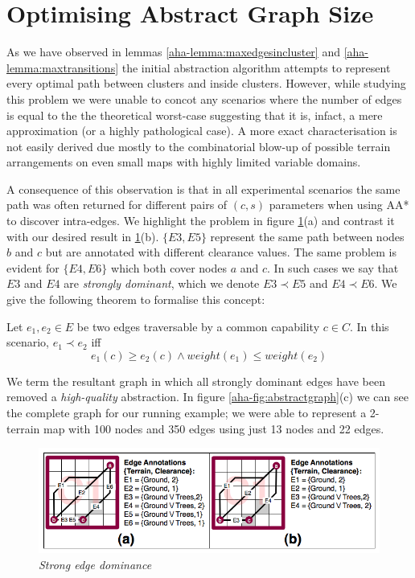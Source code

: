 \section{Optimising Abstract Graph Size}
\par \indent
As we have observed in lemmas \ref{aha-lemma:maxedgesincluster} and \ref{aha-lemma:maxtransitions} the initial abstraction algorithm attempts to represent every optimal path between clusters and inside clusters. However, while studying this problem we were unable to concot any scenarios where the number of edges is equal to the the theoretical worst-case suggesting that it is, infact, a mere approximation (or a highly pathological case).  A more exact characterisation is not easily derived due mostly to the combinatorial blow-up of possible terrain arrangements on even small maps with highly limited variable domains.
\par \indent 
A consequence of this observation is that in all experimental scenarios the same path was often returned for different pairs of $(c, s)$ parameters when using AA* to discover intra-edges. We highlight the problem in figure \ref{aha-fig:strongdominance}(a) and contrast it with our desired result in \ref{aha-fig:strongdominance}(b). $\lbrace E3, E5 \rbrace$ represent the same path between nodes $b$ and $c$ but are annotated with different clearance values. The same problem is evident for $\lbrace E4, E6 \rbrace$ which both cover nodes $a$ and $c$. In such cases we say that $E3$ and $E4$ are \emph{strongly dominant}, which we denote $E3 \prec E5$ and $E4 \prec E6$. We give the following theorem to formalise this concept:

\begin{theorem}
\label{aha-theorem:strongdominance}
Let $e_{1}, e_{2} \in E$ be two edges traversable by a common capability $c \in C$. In this scenario, $e_{1} \prec e_{2}$ iff
$$ e_{1}(c) \geq e_{2}(c) \wedge weight(e_{1}) \leq weight(e_{2})$$
\end{theorem}

We term the resultant graph in which all strongly dominant edges have been removed a \emph{high-quality} abstraction. In figure \ref{aha-fig:abstractgraph}(c) we can see the complete graph for our running example; we were able to represent a 2-terrain map with 100 nodes and 350 edges using just 13 nodes and  22 edges. 

\begin{figure}[htbp]
        \caption{\emph{Strong edge dominance} }
        \begin{center}
                        \includegraphics[scale=0.3]{diagrams/intraedges_initial.png}
        \end{center}
        \label{aha-fig:strongdominance}
\end{figure}

